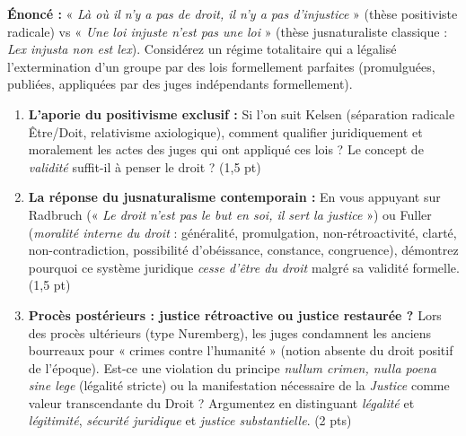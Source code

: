 \documentclass[11pt]{article}
\begin{document}
\begin{exercice}
\textbf{Énoncé :} « \textit{Là où il n'y a pas de droit, il n'y a pas d'injustice} » (thèse positiviste radicale) vs « \textit{Une loi injuste n'est pas une loi} » (thèse jusnaturaliste classique : \textit{Lex injusta non est lex}). Considérez un régime totalitaire qui a légalisé l'extermination d'un groupe par des lois formellement parfaites (promulguées, publiées, appliquées par des juges indépendants formellement).

\begin{enumerate}
    \item \textbf{L'aporie du positivisme exclusif :} Si l'on suit Kelsen (séparation radicale Être/Doit, relativisme axiologique), comment qualifier juridiquement et moralement les actes des juges qui ont appliqué ces lois ? Le concept de \textit{validité} suffit-il à penser le droit ? (1,5 pt)
    \item \textbf{La réponse du jusnaturalisme contemporain :} En vous appuyant sur Radbruch (« \textit{Le droit n'est pas le but en soi, il sert la justice} ») ou Fuller (\textit{moralité interne du droit} : généralité, promulgation, non-rétroactivité, clarté, non-contradiction, possibilité d'obéissance, constance, congruence), démontrez pourquoi ce système juridique \textit{cesse d'être du droit} malgré sa validité formelle. (1,5 pt)
    \item \textbf{Procès postérieurs : justice rétroactive ou justice restaurée ?} Lors des procès ultérieurs (type Nuremberg), les juges condamnent les anciens bourreaux pour « crimes contre l'humanité » (notion absente du droit positif de l'époque). Est-ce une violation du principe \textit{nullum crimen, nulla poena sine lege} (légalité stricte) ou la manifestation nécessaire de la \textit{Justice} comme valeur transcendante du Droit ? Argumentez en distinguant \textit{légalité} et \textit{légitimité}, \textit{sécurité juridique} et \textit{justice substantielle}. (2 pts)
\end{enumerate}
\end{exercice}
\end{document}

